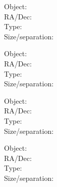 \bigskip\noindent 

\parbox[b]{8cm}{ Object: \makebox[3cm]{\hrulefill}\\
RA/Dec: \makebox[3cm]{\hrulefill} \\
Type: \makebox[3cm]{\hrulefill} \\
Size/separation:  \makebox[1.5cm]{\hrulefill} \\ }   \begin{minipage}[b]{8cm}{}\end{minipage}

\bigskip\noindent 

\parbox[b]{8cm}{ Object: \makebox[3cm]{\hrulefill}\\
RA/Dec: \makebox[3cm]{\hrulefill} \\
Type: \makebox[3cm]{\hrulefill} \\
Size/separation:  \makebox[1.5cm]{\hrulefill} \\ }   \begin{minipage}[b]{8cm}{}\end{minipage}

\bigskip\noindent 

\parbox[b]{8cm}{ Object: \makebox[3cm]{\hrulefill}\\
RA/Dec: \makebox[3cm]{\hrulefill} \\
Type: \makebox[3cm]{\hrulefill} \\
Size/separation:  \makebox[1.5cm]{\hrulefill} \\ }   \begin{minipage}[b]{8cm}{}\end{minipage}

\bigskip\noindent 

\parbox[b]{8cm}{ Object: \makebox[3cm]{\hrulefill}\\
RA/Dec: \makebox[3cm]{\hrulefill} \\
Type: \makebox[3cm]{\hrulefill} \\
Size/separation:  \makebox[1.5cm]{\hrulefill} \\ }   \begin{minipage}[b]{8cm}{}\end{minipage}

\bigskip\noindent 


